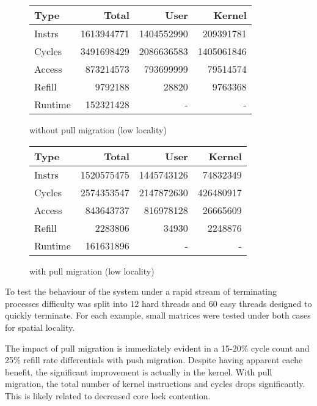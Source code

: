 \documentclass[11pt]{article}
\begin{document}
\begin{figure*}[!h]
	\begin{subtable}{.48\textwidth}
		\centering                 
		\begin{tabular}{l|rrr}       
			Type    & Total      & User       & Kernel     \\
			\hline
			Instrs  & 1613944771 & 1404552990 & 209391781  \\ 
			Cycles  & 3491698429 & 2086636583 & 1405061846 \\ 
			Access  & 873214573  & 793699999  & 79514574   \\ 
			Refill  & 9792188    & 28820      & 9763368    \\ 
			Runtime & 152321428  & -          & -          \\ 
			\hline
		\end{tabular}
		\caption{without pull migration (low locality)}
	\end{subtable}
	\hfill
	\begin{subtable}{.48\textwidth}
		\centering                 
		\begin{tabular}{l|rrr}  
			Type    & Total      & User       & Kernel    \\
			\hline
			Instrs  & 1520575475 & 1445743126 & 74832349  \\ 
			Cycles  & 2574353547 & 2147872630 & 426480917 \\ 
			Access  & 843643737  & 816978128  & 26665609  \\ 
			Refill  & 2283806    & 34930      & 2248876   \\ 
			Runtime & 161631896  & -          & -         \\ 
			\hline
		\end{tabular}
		\caption{with pull migration (low locality)}        
	\end{subtable}
\end{figure*}

To test the behaviour of the system under a rapid stream of terminating processes difficulty was split into 12 hard threads and 60 easy threads designed to quickly terminate.  For each example, small matrices were tested under both cases for spatial locality.

The impact of pull migration is immediately evident in a 15-20\% cycle count and 25\% refill rate differentials with push migration.  Despite having apparent cache benefit, the significant improvement is actually in the kernel.  With pull migration, the total number of kernel instructions and cycles drops significantly.  This is likely related to decreased core lock contention.
\end{document}
